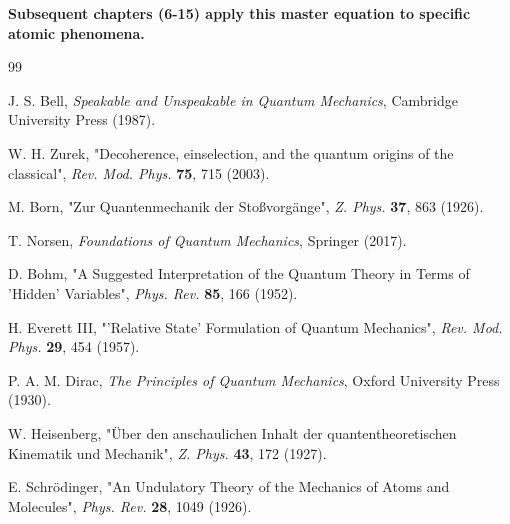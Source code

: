 \textbf{Subsequent chapters (6-15) apply this master equation to specific atomic phenomena.}




\begin{thebibliography}{99}

J. S. Bell, \emph{Speakable and Unspeakable in Quantum Mechanics}, Cambridge University Press (1987).

W. H. Zurek, "Decoherence, einselection, and the quantum origins of the classical", \emph{Rev. Mod. Phys.} \textbf{75}, 715 (2003).

M. Born, "Zur Quantenmechanik der Stoßvorgänge", \emph{Z. Phys.} \textbf{37}, 863 (1926).

T. Norsen, \emph{Foundations of Quantum Mechanics}, Springer (2017).

D. Bohm, "A Suggested Interpretation of the Quantum Theory in Terms of 'Hidden' Variables", \emph{Phys. Rev.} \textbf{85}, 166 (1952).

H. Everett III, "'Relative State' Formulation of Quantum Mechanics", \emph{Rev. Mod. Phys.} \textbf{29}, 454 (1957).

P. A. M. Dirac, \emph{The Principles of Quantum Mechanics}, Oxford University Press (1930).

W. Heisenberg, "Über den anschaulichen Inhalt der quantentheoretischen Kinematik und Mechanik", \emph{Z. Phys.} \textbf{43}, 172 (1927).

E. Schrödinger, "An Undulatory Theory of the Mechanics of Atoms and Molecules", \emph{Phys. Rev.} \textbf{28}, 1049 (1926).

\end{thebibliography}



